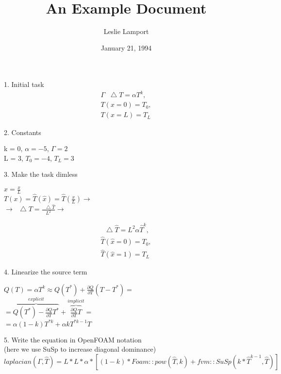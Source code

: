 \documentclass{article}      %
\title{An Example Document}  %
\author{Leslie Lamport}      %
\date{January 21, 1994}      %
\newcommand*\Laplace{\mathop{}\!\mathbin\bigtriangleup}
\begin{document}


1. Initial task
\begin{gather}
\Gamma \Laplace T=\alpha T^{k}, \\ 
T(x=0)=T_{0}, \\
T(x=L)=T_{L} 
\end{gather}

2. Constants\\
\begin{center}
k = 0,
$\alpha = -5$,
$\Gamma = 2$\\
L = 3,
$T_{0} = -4$,
$T_{L} = 3$\\
\end{center}

3. Make the task dimless\\
\begin{center}

$\hat{x} = \frac{x}{L}$ \\
$T(x) = \hat{T}(\hat{x}) = \hat{T}(\frac{x}{L}) \rightarrow$\\
$\rightarrow \Laplace T = \frac{\Laplace \hat{T}}{L^{2}} \rightarrow$
\end{center}
\begin{gather}
\Laplace \hat{T} = L^{2} \alpha \hat{T}^{k}, \\
\hat{T}(\hat{x}=0)=T_{0}, \\
\hat{T}(\hat{x}=1)=T_{L}
\end{gather}

4. Linearize the source term
\begin{center}
$Q(T) = \alpha T^{k} \approx Q(T^{*}) + \frac{\partial Q}{\partial T} (T-T^{*}) = $\\
$= \overbrace{Q(T^{*}) - \frac{\partial Q}{\partial T} T^{*}}^{explicit} + \overbrace{\frac{\partial Q}{\partial T} T}^{implicit} = $\\
$= \alpha (1-k) T^{*k} +  \alpha k T^{*k-1} T$
\end{center}

5. Write the equation in OpenFOAM notation\\
(here we use SuSp to increase diagonal dominance)
\begin{equation}
laplacian(\Gamma, \hat{T}) = L*L*\alpha*[(1-k)*Foam::pow(\hat{T}, k) + fvm::SuSp(k*\hat{T}^{k-1}, \hat{T})]
\end{equation} 
\end{document}
